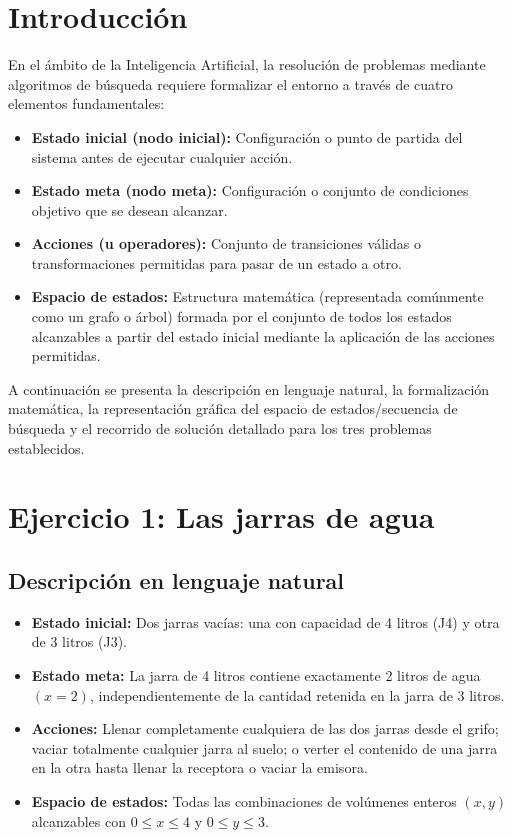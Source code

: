 \documentclass[11pt,letterpaper]{article}
\begin{document}
\portada
\indicegeneral

\section{Introducción}

En el ámbito de la Inteligencia Artificial, la resolución de problemas mediante algoritmos de búsqueda requiere formalizar el entorno a través de cuatro elementos fundamentales:

\begin{itemize}
  \item \textbf{Estado inicial (nodo inicial):} Configuración o punto de partida del sistema antes de ejecutar cualquier acción.
  \item \textbf{Estado meta (nodo meta):} Configuración o conjunto de condiciones objetivo que se desean alcanzar.
  \item \textbf{Acciones (u operadores):} Conjunto de transiciones válidas o transformaciones permitidas para pasar de un estado a otro.
  \item \textbf{Espacio de estados:} Estructura matemática (representada comúnmente como un grafo o árbol) formada por el conjunto de todos los estados alcanzables a partir del estado inicial mediante la aplicación de las acciones permitidas.
\end{itemize}

A continuación se presenta la descripción en lenguaje natural, la formalización matemática, la representación gráfica del espacio de estados/secuencia de búsqueda y el recorrido de solución detallado para los tres problemas establecidos.

\section{Ejercicio 1: Las jarras de agua}

\subsection{Descripción en lenguaje natural}
\begin{itemize}
  \item \textbf{Estado inicial:} Dos jarras vacías: una con capacidad de 4 litros (J4) y otra de 3 litros (J3).
  \item \textbf{Estado meta:} La jarra de 4 litros contiene exactamente 2 litros de agua $(x = 2)$, independientemente de la cantidad retenida en la jarra de 3 litros.
  \item \textbf{Acciones:} Llenar completamente cualquiera de las dos jarras desde el grifo; vaciar totalmente cualquier jarra al suelo; o verter el contenido de una jarra en la otra hasta llenar la receptora o vaciar la emisora.
  \item \textbf{Espacio de estados:} Todas las combinaciones de volúmenes enteros $(x, y)$ alcanzables con $0 \le x \le 4$ y $0 \le y \le 3$.
\end{itemize}
\end{document}

